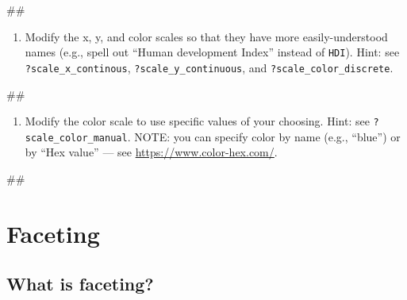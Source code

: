 \documentclass[]{book}
\newenvironment{Shaded}{\begin{snugshade}}{\end{snugshade}}
\newcommand{\NormalTok}[1]{#1}
\providecommand{\tightlist}{%
  \setlength{\itemsep}{0pt}\setlength{\parskip}{0pt}}
\begin{document}
\begin{Shaded}
\begin{Highlighting}[]
\NormalTok{## }
\end{Highlighting}
\end{Shaded}

\begin{enumerate}
\def\labelenumi{\arabic{enumi}.}
\setcounter{enumi}{1}
\tightlist
\item
  Modify the x, y, and color scales so that they have more
  easily-understood names (e.g., spell out ``Human development Index''
  instead of \texttt{HDI}). Hint: see \texttt{?scale\_x\_continous},
  \texttt{?scale\_y\_continuous}, and \texttt{?scale\_color\_discrete}.
\end{enumerate}

\begin{Shaded}
\begin{Highlighting}[]
\NormalTok{## }
\end{Highlighting}
\end{Shaded}

\begin{enumerate}
\def\labelenumi{\arabic{enumi}.}
\setcounter{enumi}{2}
\tightlist
\item
  Modify the color scale to use specific values of your choosing. Hint:
  see \texttt{?scale\_color\_manual}. NOTE: you can specify color by
  name (e.g., ``blue'') or by ``Hex value'' --- see
  \url{https://www.color-hex.com/}.
\end{enumerate}

\begin{Shaded}
\begin{Highlighting}[]
\NormalTok{## }
\end{Highlighting}
\end{Shaded}

\section{Faceting}\label{faceting}

\subsection{What is faceting?}\label{what-is-faceting}
\end{document}
